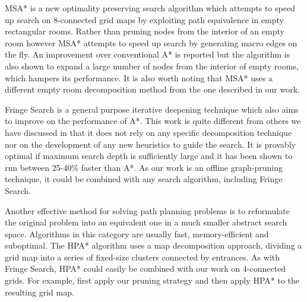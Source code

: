 \par
MSA* \cite{bolanca09} is a new optimality preserving search algorithm which attempts to speed up search 
on 8-connected grid maps by exploiting path equivalence in empty rectangular rooms. 
Rather than pruning nodes from the interior of an empty room however MSA* attempts to speed up 
search by generating macro edges on the fly.
An improvement over conventional A* is reported but the algorithm is also
shown to expand a large number of nodes from the interior of empty rooms, which hampers its performance.
It is also worth noting that MSA* uses a different empty room decomposition method
from the one described in our work.
\par
Fringe Search \cite{bjornsson05} is a general purpose iterative deepening technique which also
aims to improve on the performance of A*.
This work is quite different from others we have discussed in that it does not
rely on any specific decomposition technique nor on the development of any new heuristics
to guide the search.
It is provably optimal if maximum search depth is sufficiently large and 
it has been shown to run between 25-40\% faster than A*.
As our work is an offline graph-pruning technique, it could be combined with any search algorithm, including
Fringe Search.
\par
Another effective method for solving path planning problems is to reformulate the original problem
into an equivalent one in a much smaller abstract search space.
Algorithms in this category are usually fast, memory-efficient and suboptimal.
The HPA* algorithm \cite{botea04} uses a map decomposition approach,
dividing a grid map into a series of fixed-size clusters connected 
by entrances.
As with Fringe Search, HPA* could easily be combined with our work on 4-connected grids. For example, first apply our pruning strategy and then apply HPA* to the resulting grid map.

